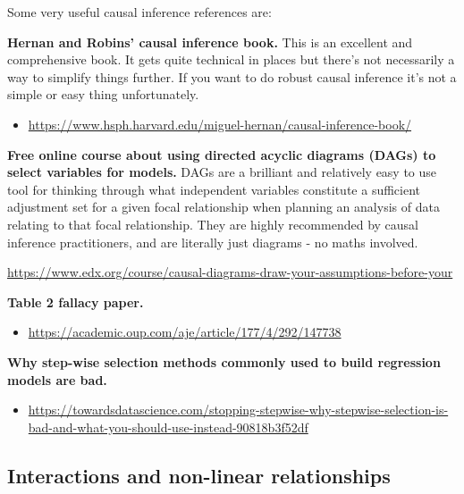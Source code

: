 \documentclass[
]{book}
\providecommand{\tightlist}{%
  \setlength{\itemsep}{0pt}\setlength{\parskip}{0pt}}
\begin{document}
Some very useful causal inference references are:

\textbf{Hernan and Robins' causal inference book.} This is an excellent and comprehensive book. It gets quite technical in places but there's not necessarily a way to simplify things further. If you want to do robust causal inference it's not a simple or easy thing unfortunately.

\begin{itemize}
\tightlist
\item
  \url{https://www.hsph.harvard.edu/miguel-hernan/causal-inference-book/}
\end{itemize}

\textbf{Free online course about using directed acyclic diagrams (DAGs) to select variables for models.} DAGs are a brilliant and relatively easy to use tool for thinking through what independent variables constitute a sufficient adjustment set for a given focal relationship when planning an analysis of data relating to that focal relationship. They are highly recommended by causal inference practitioners, and are literally just diagrams - no maths involved.

\url{https://www.edx.org/course/causal-diagrams-draw-your-assumptions-before-your}

\textbf{Table 2 fallacy paper.}

\begin{itemize}
\tightlist
\item
  \url{https://academic.oup.com/aje/article/177/4/292/147738}
\end{itemize}

\textbf{Why step-wise selection methods commonly used to build regression models are bad.}

\begin{itemize}
\tightlist
\item
  \url{https://towardsdatascience.com/stopping-stepwise-why-stepwise-selection-is-bad-and-what-you-should-use-instead-90818b3f52df}
\end{itemize}

\hypertarget{interactions-and-non-linear-relationships}{%
\subsection{Interactions and non-linear relationships}\label{interactions-and-non-linear-relationships}}
\end{document}
